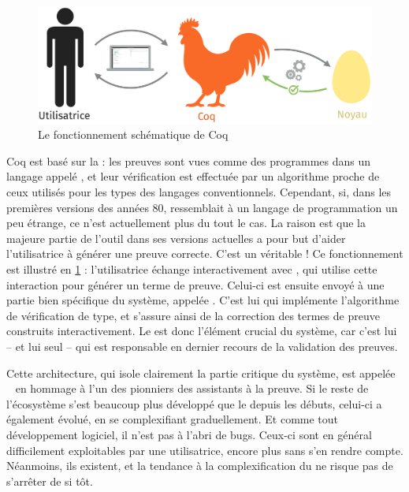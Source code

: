 \begin{figure}[h]

  \centering
  \includegraphics{./figures/coq-kernel-fr.pdf}

  \caption{Le fonctionnement schématique de Coq}
  \label{fig-coq}
\end{figure}

Coq est basé sur la  : les preuves sont vues comme des programmes dans un langage appelé ,
et leur vérification est effectuée par un algorithme proche
de ceux utilisés pour les types des langages conventionnels.
Cependant, si, dans les premières versions des années 80,  ressemblait à un langage de programmation un peu étrange, ce n’est actuellement plus du tout le cas.
La raison est que la majeure partie de l’outil dans ses versions actuelles a
pour but d’aider l’utilisatrice à générer une preuve correcte. C’est un véritable
 !
Ce fonctionnement est illustré en \cref{fig-coq} : l’utilisatrice échange interactivement avec , qui utilise cette interaction pour générer un terme de preuve. Celui-ci est ensuite envoyé à une partie bien spécifique du système, appelée .
C’est lui qui implémente l’algorithme de vérification de type, et s’assure ainsi de la correction des termes de preuve construits interactivement.
Le  est donc l’élément crucial du système, car c’est lui – et lui seul – qui est responsable en dernier recours de la validation des preuves.

Cette architecture, qui isole clairement la partie critique du système,
est appelée ~ en 
hommage à l’un des pionniers des assistants à la preuve.
Si le reste de l’écosystème s’est beaucoup plus développé que le  depuis les débuts, celui-ci a également évolué, en se complexifiant graduellement.
Et comme tout développement logiciel, il n’est pas à l’abri de bugs.
Ceux-ci sont en général difficilement exploitables par une utilisatrice,
encore plus sans s’en rendre compte.
Néanmoins, ils existent,
et la tendance à la complexification du  ne risque pas de s’arrêter de si tôt.

